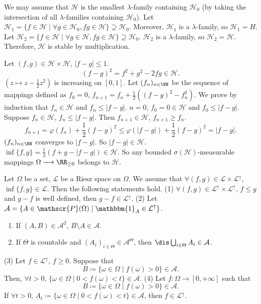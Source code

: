 \begin{proofenv}
    We may assume that $\mathcal{H}$ is the smallest $\lambda$-family containing $\mathcal{H}_0$ (by taking the intersection of all $\lambda$-families containing $\mathcal{H}_0$).
    Let $\mathcal{H}_1=\{f\in \mathcal{H}\mid \forall g\in \mathcal{H}_0, fg\in \mathcal{H}\}\supseteq \mathcal{H}_0.$
    Moreover, $\mathcal{H}_1$ is a $\lambda$-family, so $\mathcal{H}_1=H$. Let $\mathcal{H}_2=\{f\in \mathcal{H}\mid \forall g\in \mathcal{H},fg\in \mathcal{H}\}\supseteq\mathcal{H}_0$. $\mathcal{H}_2$ is a $\lambda$-family, so $\mathcal{H}_2=\mathcal{H}$.
    Therefore, $\mathcal{H}$ is stable by multiplication.

    Let $(f,g)\in \mathcal{H}\times\mathcal{H}$, $|f-g|\le 1$.
    $$ (f-g)^2=f^2+g^2-2fg\in \mathcal{H}.$$
    $(z\longmapsto z-\frac{1}{2}z^2)$ is increasing on $[0,1]$. Let $(f_n)_{n\in \NN}$ be the sequence of mappings defined as $f_0=0$, $f_{n+1}=f_n+\frac{1}{2}\left((f-g)^2-f_n^2\right)$.
    We prove by induction that $f_n\in \mathcal{H}$ and $f_n\le |f-g|$.
    \newline
    $n=0$, $f_0=0\in \mathcal{H}$ and $f_0\le |f-g|$. Suppose $f_n\in \mathcal{H}$, $f_n\le |f-g|$.
    Then $f_{n+1}\in \mathcal{H}$, $f_{n+1}\ge f_n$.
    $$f_{n+1}=\varphi(f_n)+\frac{1}{2}(f-g)^2\le \varphi(|f-g|)+\frac{1}{2}(f-g)^2 = |f-g|.$$
    $(f_n)_{n\in \NN}$ converges to $|f-g|$. So $|f-g|\in \mathcal{H}$. $\inf\{f,g\}=\frac{1}{2}\left(f+g - |f-g|\right)\in \mathcal{H}$. So any bounded $\sigma(\mathcal{H})$-measurable mappings $\Omega\longrightarrow \RR_{\ge0}$ belongs to $\mathcal{H}$.
\end{proofenv}
\begin{theoremenv}
    Let $\Omega$ be a set, $\mathcal{L}$ be a Riesz space on $\Omega$. We assume that $\forall (f,g)\in \mathcal{L}\times \mathcal{L}^\uparrow$, $\inf\{f,g\}\in \mathcal{L}$.
    Then the following statements hold.
    \newline
    (1) $\forall (f,g)\in \mathcal{L}^\uparrow\times \mathcal{L}^\uparrow$, $f\le g$ and $g-f$ is well defined, then $g-f\in \mathcal{L}^\uparrow$. 
    \newline
    (2) Let $\mathcal{A}=\{A\in \mathscr{P}(\Omega)\mid \mathbbm{1}_{A}\in \mathcal{L}^\uparrow\}$.
    \begin{enumerate}
        \item If $(A,B)\in\mathcal{A}^2$, $B\setminus A\in \mathcal{A}$.
        \item If $\Theta$ is countable and $(A_i)_{i\in \Theta}\in \mathcal{A}^{\Theta}$, then $\dis \bigcup_{i\in \Theta}A_i\in \mathcal{A}$.
    \end{enumerate}
    (3) Let $f\in \mathcal{L}^\uparrow$, $f\ge 0$. Suppose that
    $$ B\coloneq\{\omega\in \Omega\mid f(\omega)>0\}\in \mathcal{A}.$$
    Then, $\forall t>0$, $\{\omega\in \Omega\mid 0<f(\omega)<t\}\in \mathcal{A}.$
    \newline
    (4) Let $f:\Omega\longrightarrow [0,+\infty]$ such that
    $$ B\coloneq \{\omega\in \Omega\mid f(\omega)>0\}\in \mathcal{A}.$$
    If $\forall t>0$, $A_t\coloneq\{\omega\in \Omega\mid 0<f(\omega)<t\}\in\mathcal{A}$, then $f\in \mathcal{L}^\uparrow$.
\end{theoremenv}
